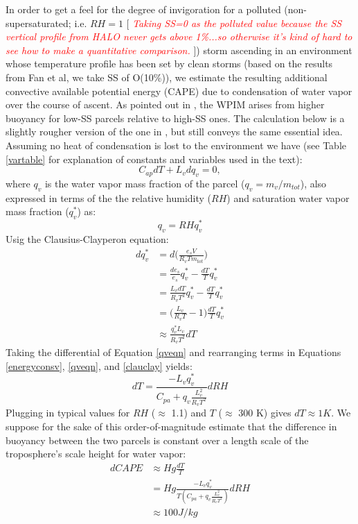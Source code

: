 \documentclass{article}
\newcommand{\klcomm}[1]{\textcolor{red}{\textit{#1}}}
\begin{document}
In order to get a feel for the degree of invigoration for a polluted (non-supersaturated; i.e. $RH=1$ [ \klcomm{Taking SS=0 as the polluted value because the SS vertical profile from HALO never gets above 1\%...so otherwise it's kind of hard to see how to make a quantitative comparison.} ]) storm ascending in an environment whose temperature profile has been set by clean storms (based on the results from Fan et al, we take SS of O(10\%)), we estimate the resulting additional convective available potential energy (CAPE) due to condensation of water vapor over the course of ascent. As pointed out in \cite{Grabowski2020}, the WPIM arises from higher buoyancy for low-SS parcels relative to high-SS ones. The calculation below is a slightly rougher version of the one in \cite{Grabowski2015}, but still conveys the same essential idea. Assuming no heat of condensation is lost to the environment we have (see Table \ref{vartable} for explanation of constants and variables used in the text):
\begin{equation}
\label{energyconsv}
C_{ap}dT + L_vdq_v = 0,
\end{equation}
where $q_v$ is the water vapor mass fraction of the parcel ($q_v=m_v/m_{tot}$), also expressed in terms of the the relative humidity ($RH$) and saturation water vapor mass fraction ($q_v^*$) as:
\begin{equation}
\label{qveqn}
q_v = RHq_v^*
\end{equation}
Usig the Clausius-Clayperon equation:
\begin{align}
\label{clauclay}
dq_v^* &= d\Big(\frac{e_sV}{R_vTm_{tot}}\Big)\nonumber\\
&=\frac{de_s}{e_s}q_v^* - \frac{dT}{T}q_v^*\nonumber\\
&=\frac{L_vdT}{R_vT^2}q_v^* - \frac{dT}{T}q_v^*\nonumber\\
&=\Big(\frac{L_v}{R_vT} - 1\Big)\frac{dT}{T}q_v^*\nonumber\\
&\approx \frac{q_v^*L_v}{R_vT^2}dT
\end{align}
Taking the differential of Equation \ref{qveqn} and rearranging terms in Equations \ref{energyconsv}, \ref{qveqn}, and \ref{clauclay} yields:
\begin{equation}
dT = \frac{-L_vq_v^*}{C_{pa} + q_v\frac{L_v^2}{R_vT^2}}dRH
\end{equation}
Plugging in typical values for $RH$ ($\approx$ 1.1) and $T$ ($\approx$ 300 K) gives $dT\approx 1K$. We suppose for the sake of this order-of-magnitude estimate that the difference in buoyancy between the two parcels is constant over a length scale of the troposphere's scale height for water vapor:
\begin{align}
dCAPE &\approx Hg \frac{dT}{T}\nonumber\\
&=Hg\frac{-L_vq_v^*}{T(C_{pa} + q_v\frac{L_v^2}{R_vT^2})}dRH\nonumber\\
&\approx 100 J/kg
\end{align}
\end{document}
